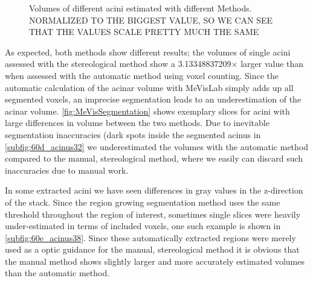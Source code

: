 \documentclass[twoside,paper=a4,abstract=true,english,DIVcalc]{scrartcl}
\newcommand{\difference}{3.13348837209} %
\begin{document}
\begin{figure}[htb]
	\caption{Volumes of different acini estimated with different Methods. NORMALIZED TO THE BIGGEST VALUE, SO WE CAN SEE THAT THE VALUES SCALE PRETTY MUCH THE SAME}
	\label{fig:VolumeMeVisVsSTEPanizerNormalized}
\end{figure}

As expected, both methods show different results; the volumes of single acini assessed with the stereological method show a \difference\(\times\) larger value than when assessed with the automatic method using voxel counting. Since the automatic calculation of the acinar volume with MeVisLab simply adds up all segmented voxels, an imprecise segmentation leads to an underestimation of the acinar volume. \autoref{fig:MeVisSegmentation} shows exemplary slices for acini with large differences in volume between the two methods. Due to inevitable segmentation inaccuracies (dark spots inside the segmented acinus in \autoref{subfig:60d_acinus32} we underestimated the volumes with the automatic method compared to the manual, stereological method, where we easily can discard such inaccuracies due to manual work.

In some extracted acini we have seen differences in gray values in the z-direction of the stack. Since the region growing segmentation method uses the same threshold throughout the region of interest, sometimes single slices were heavily under-estimated in terms of included voxels, one such example is shown in \autoref{subfig:60e_acinus38}. Since these automatically extracted regions were merely used as a optic guidance for the manual, stereological method it is obvious that the manual method shows slightly larger and more accurately estimated volumes than the automatic method.
\end{document}
